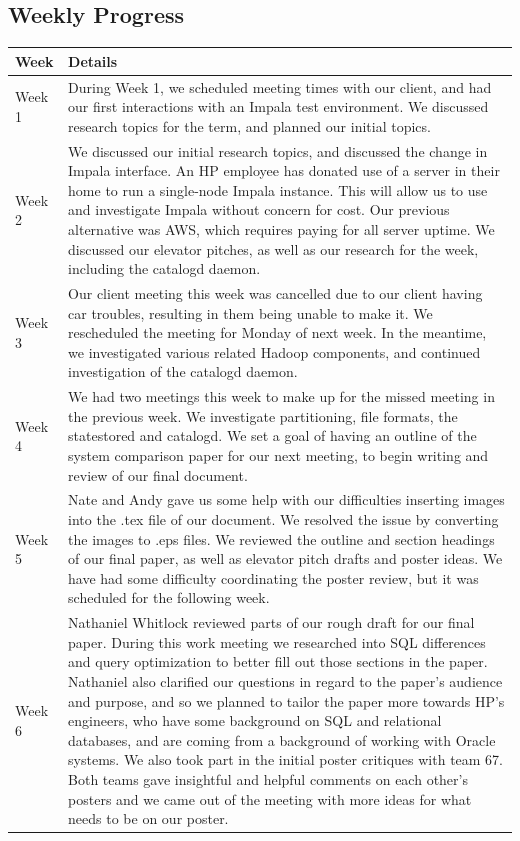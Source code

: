 \documentclass[onecolumn, draftclsnofoot,10pt, compsoc]{IEEEtran}
\begin{document}
\subsection{Weekly Progress}
\begin{tabular}{l | p{15 cm}}
    Week & Details  \\ \hline
    Week 1 & During Week 1, we scheduled meeting times with our client, and had our first interactions with an Impala test environment. We discussed research topics for the term, and planned our initial topics. \\
    Week 2 & We discussed our initial research topics, and discussed the change in Impala interface. An HP employee has donated use of a server in their home to run a single-node Impala instance. This will allow us to use and investigate Impala without concern for cost. Our previous alternative was AWS, which requires paying for all server uptime. We discussed our elevator pitches, as well as our research for the week, including the catalogd daemon. \\
    Week 3 & Our client meeting this week was cancelled due to our client having car troubles, resulting in them being unable to make it. We rescheduled the meeting for Monday of next week. In the meantime, we investigated various related Hadoop components, and continued investigation of the catalogd daemon. \\
    Week 4 & We had two meetings this week to make up for the missed meeting in the previous week. We investigate partitioning, file formats, the statestored and catalogd. We set a goal of having an outline of the system comparison paper for our next meeting, to begin writing and review of our final document. \\
    Week 5 & Nate and Andy gave us some help with our difficulties inserting images into the .tex file of our document. We resolved the issue by converting the images to .eps files. We reviewed the outline and section headings of our final paper, as well as elevator pitch drafts and poster ideas. We have had some difficulty coordinating the poster review, but it was scheduled for the following week.  \\
    Week 6 & Nathaniel Whitlock reviewed parts of our rough draft for our final paper. During this work meeting we researched into SQL differences and query optimization to better fill out those sections in the paper. Nathaniel also clarified our questions in regard to the paper’s audience and purpose, and so we planned to tailor the paper more towards HP’s engineers, who have some background on SQL and relational databases, and are coming from a background of working with Oracle systems. We also took part in the initial poster critiques with team 67. Both teams gave insightful and helpful comments on each other’s posters and we came out of the meeting with more ideas for what needs to be on our poster.  \\

\end{tabular}
\end{document}
